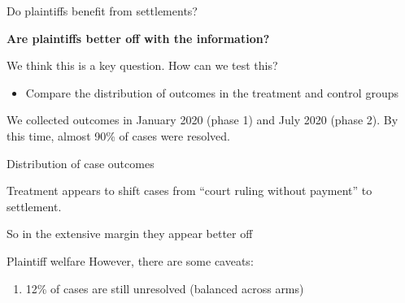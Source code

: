 \documentclass[9pt]{beamer}
\begin{document}
\begin{frame}{Do plaintiffs benefit from settlements?}
    
    \textbf{Are plaintiffs better off with the information?}
    
    \vspace{6mm}
    We think this is a key question. How can we test this?
    \vspace{3mm}
    \begin{itemize}
        \item Compare the distribution of outcomes in the treatment and control groups
    \end{itemize}
    
    
    \vspace{6mm}
    We collected outcomes in January 2020 (phase 1) and July 2020 (phase 2). By this time, almost 90\% of cases were resolved.
    
\end{frame}

\begin{frame}{Distribution of case outcomes}

Treatment appears to shift cases from ``court ruling without payment'' to settlement.

\vspace{4mm}
     \begin{table}[H]
    \label{outcomes}
    \begin{center}
     \resizebox{0.725\columnwidth}{!}{\scriptsize{}}
        \end{center}
\end{table}

\vspace{.1in}
So in the extensive margin they appear better off
\end{frame}


 
 \begin{frame}{Plaintiff welfare}
    However, there are some caveats:
    \begin{enumerate}
    \vspace{2mm}
        \item 12\% of cases are still unresolved  (balanced across arms)
    \end{enumerate}
 \end{frame}
 
\end{document}

